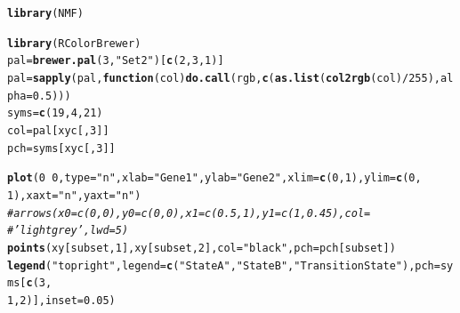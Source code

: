 \documentclass{article}\usepackage[]{graphicx}\usepackage[]{color}
\makeatletter
\newcommand{\hlnum}[1]{\textcolor[rgb]{0.686,0.059,0.569}{#1}}%
\newcommand{\hlstr}[1]{\textcolor[rgb]{0.192,0.494,0.8}{#1}}%
\newcommand{\hlcom}[1]{\textcolor[rgb]{0.678,0.584,0.686}{\textit{#1}}}%
\newcommand{\hlopt}[1]{\textcolor[rgb]{0,0,0}{#1}}%
\newcommand{\hlstd}[1]{\textcolor[rgb]{0.345,0.345,0.345}{#1}}%
\newcommand{\hlkwa}[1]{\textcolor[rgb]{0.161,0.373,0.58}{\textbf{#1}}}%
\newcommand{\hlkwb}[1]{\textcolor[rgb]{0.69,0.353,0.396}{#1}}%
\newcommand{\hlkwc}[1]{\textcolor[rgb]{0.333,0.667,0.333}{#1}}%
\newcommand{\hlkwd}[1]{\textcolor[rgb]{0.737,0.353,0.396}{\textbf{#1}}}%
\newenvironment{kframe}{%
 \def\at@end@of@kframe{}%
 \ifinner\ifhmode%
  \def\at@end@of@kframe{\end{minipage}}%
  \begin{minipage}{\columnwidth}%
 \fi\fi%
 \def\FrameCommand##1{\hskip\@totalleftmargin \hskip-\fboxsep
 \colorbox{shadecolor}{##1}\hskip-\fboxsep
     \hskip-\linewidth \hskip-\@totalleftmargin \hskip\columnwidth}%
 \MakeFramed {\advance\hsize-\width
   \@totalleftmargin\z@ \linewidth\hsize
   \@setminipage}}%
 {\par\unskip\endMakeFramed%
 \at@end@of@kframe}
\newenvironment{knitrout}{}{} %
\makeatother
\begin{document}
\begin{knitrout}
\color{fgcolor}\begin{kframe}
\begin{alltt}
\hlkwd{library}\hlstd{(NMF)}
\end{alltt}


{\ttfamily\noindent\itshape\color{messagecolor}{\#\# Loading required package: methods\\\#\# Loading required package: pkgmaker\\\#\# Loading required package: registry\\\#\# Loading required package: rngtools\\\#\# Loading required package: cluster\\\#\# NMF - BioConductor layer [OK] | Shared memory capabilities [OK] | Cores 7/8}}\begin{alltt}
\hlkwd{library}\hlstd{(RColorBrewer)}
\hlstd{pal} \hlkwb{=} \hlkwd{brewer.pal}\hlstd{(}\hlnum{3}\hlstd{,} \hlstr{"Set2"}\hlstd{)[}\hlkwd{c}\hlstd{(}\hlnum{2}\hlstd{,} \hlnum{3}\hlstd{,} \hlnum{1}\hlstd{)]}
\hlstd{pal} \hlkwb{=} \hlkwd{sapply}\hlstd{(pal,} \hlkwa{function}\hlstd{(}\hlkwc{col}\hlstd{)} \hlkwd{do.call}\hlstd{(rgb,} \hlkwd{c}\hlstd{(}\hlkwd{as.list}\hlstd{(}\hlkwd{col2rgb}\hlstd{(col)}\hlopt{/}\hlnum{255}\hlstd{),} \hlkwc{alpha} \hlstd{=} \hlnum{0.5}\hlstd{)))}
\hlstd{syms} \hlkwb{=} \hlkwd{c}\hlstd{(}\hlnum{19}\hlstd{,} \hlnum{4}\hlstd{,} \hlnum{21}\hlstd{)}
\hlstd{col} \hlkwb{=} \hlstd{pal[xyc[,} \hlnum{3}\hlstd{]]}
\hlstd{pch} \hlkwb{=} \hlstd{syms[xyc[,} \hlnum{3}\hlstd{]]}

\hlkwd{plot}\hlstd{(}\hlnum{0} \hlopt{~} \hlnum{0}\hlstd{,} \hlkwc{type} \hlstd{=} \hlstr{"n"}\hlstd{,} \hlkwc{xlab} \hlstd{=} \hlstr{"Gene 1"}\hlstd{,} \hlkwc{ylab} \hlstd{=} \hlstr{"Gene 2"}\hlstd{,} \hlkwc{xlim} \hlstd{=} \hlkwd{c}\hlstd{(}\hlnum{0}\hlstd{,} \hlnum{1}\hlstd{),} \hlkwc{ylim} \hlstd{=} \hlkwd{c}\hlstd{(}\hlnum{0}\hlstd{,}
    \hlnum{1}\hlstd{),} \hlkwc{xaxt} \hlstd{=} \hlstr{"n"}\hlstd{,} \hlkwc{yaxt} \hlstd{=} \hlstr{"n"}\hlstd{)}
\hlcom{# arrows( x0 = c(0, 0), y0 = c(0, 0), x1 = c(0.5, 1), y1 = c(1, 0.45), col =}
\hlcom{# 'lightgrey', lwd = 5)}
\hlkwd{points}\hlstd{(xy[subset,} \hlnum{1}\hlstd{], xy[subset,} \hlnum{2}\hlstd{],} \hlkwc{col} \hlstd{=} \hlstr{"black"}\hlstd{,} \hlkwc{pch} \hlstd{= pch[subset])}
\hlkwd{legend}\hlstd{(}\hlstr{"topright"}\hlstd{,} \hlkwc{legend} \hlstd{=} \hlkwd{c}\hlstd{(}\hlstr{"State A"}\hlstd{,} \hlstr{"State B"}\hlstd{,} \hlstr{"Transition State"}\hlstd{),} \hlkwc{pch} \hlstd{= syms[}\hlkwd{c}\hlstd{(}\hlnum{3}\hlstd{,}
    \hlnum{1}\hlstd{,} \hlnum{2}\hlstd{)],} \hlkwc{inset} \hlstd{=} \hlnum{0.05}\hlstd{)}
\end{alltt}
\end{kframe}


\end{knitrout}
\end{document}
